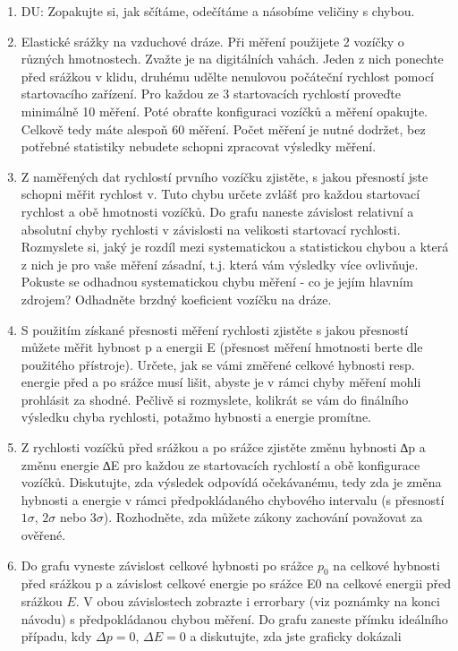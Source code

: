 \documentclass[a4paper,10pt]{article}
\begin{document}
\begin{enumerate}
\item DU: Zopakujte si, jak sčítáme, odečítáme a násobíme veličiny s chybou.
\item Elastické srážky na vzduchové dráze. Při měření použijete 2 vozíčky o různých hmotnostech.
Zvažte je na digitálních vahách. Jeden z nich ponechte před srážkou v klidu, druhému udělte
nenulovou počáteční rychlost pomocí startovacího zařízení. Pro každou ze 3 startovacích rychlostí
proveďte minimálně 10 měření. Poté obraťte konfiguraci vozíčků a měření opakujte. Celkově tedy
máte alespoň 60 měření. Počet měření je nutné dodržet, bez potřebné statistiky nebudete schopni
zpracovat výsledky měření.
\item Z naměřených dat rychlostí prvního vozíčku zjistěte, s jakou přesností jste schopni měřit rychlost
v. Tuto chybu určete zvlášť pro každou startovací rychlost a obě hmotnosti vozíčků. Do grafu
naneste závislost relativní a absolutní chyby rychlosti v závislosti na velikosti startovací rychlosti.
Rozmyslete si, jaký je rozdíl mezi systematickou a statistickou chybou a která z nich je pro
vaše měření zásadní, t.j. která vám výsledky více ovlivňuje. Pokuste se odhadnou systematickou
chybu měření - co je jejím hlavním zdrojem? Odhadněte brzdný koeficient vozíčku na dráze.
\item S použitím získané přesnosti měření rychlosti zjistěte s jakou přesností můžete měřit hybnost
p a energii E (přesnost měření hmotnosti berte dle použitého přístroje). Určete, jak se vámi
změřené celkové hybnosti resp. energie před a po srážce musí lišit, abyste je v rámci chyby
měření mohli prohlásit za shodné. Pečlivě si rozmyslete, kolikrát se vám do finálního výsledku
chyba rychlosti, potažmo hybnosti a energie promítne.
\item Z rychlosti vozíčků před srážkou a po srážce zjistěte změnu hybnosti ∆p a změnu energie ∆E
pro každou ze startovacích rychlostí a obě konfigurace vozíčků. Diskutujte, zda výsledek odpovídá
očekávanému, tedy zda je změna hybnosti a energie v rámci předpokládaného chybového intervalu
(s přesností $1\sigma$, $2\sigma$ nebo $3\sigma$). Rozhodněte, zda můžete zákony zachování považovat za ověřené.
\item Do grafu vyneste závislost celkové hybnosti po srážce $p_0$ na celkové hybnosti před srážkou p
a závislost celkové energie po srážce E0 na celkové energii před srážkou $E$. V obou závislostech
zobrazte i errorbary (viz poznámky na konci návodu) s předpokládanou chybou měření. Do grafu
zaneste přímku ideálního případu, kdy $\Delta p = 0$, $\Delta E = 0$ a diskutujte, zda jste graficky dokázali

\end{enumerate}
\end{document}

